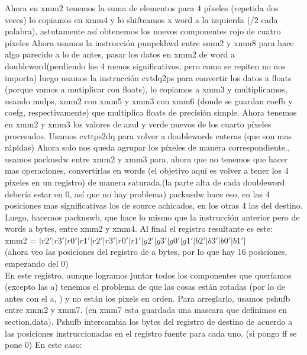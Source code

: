 \documentclass[a4paper]{article}
\begin{document}
   Ahora en xmm2 tenemos la suma de elementos para 4 píxeles (repetida dos veces) lo copiamos en xmm4 y lo shifteamos x word a la izquierda (/2 cada palabra), astutamente así obtenemos los nuevos componentes rojo de cuatro píxeles\hfill \break
   Ahora usamos la instrucción punpckhwd entre smm2 y xmm8 para hace algo parecido a lo de antes,  pasar los datos en xmm2 de word a doubleword(perdiendo los 4 menos significativos, pero como se repiten no nos importa) luego usamos la instrucción cvtdq2ps para convertir los datos a floats (porque vamos a mutiplicar con floats), lo copiamos a xmm3 y multiplicamos, usando mulps, xmm2 con xmm5 y xmm3 con xmm6 (donde se guardan coefb y coefg, respectivamente) que multiplica floats de precisión simple. Ahora tenemos en xmm2 y xmm3 los valores de azul y verde nuevos de los cuarto píxeles procesados. Usamos cvttps2dq para volver a doublewords enteras (que son mas rápidas)\hfill \break
   Ahora solo nos queda agrupar los píxeles de  manera correspondiente., usamos packusdw entre xmm2 y xmm3 para, ahora que no tenemos que hacer mas operaciones, convertirlas en words (el objetivo aquí es volver a tener los 4 píxeles en un registro) de manera saturada.(la parte alta de cada doubleword debería estar en 0, así que no hay problema) packusdw hace eso, en las 4 posiciones mas significativas los de source achicados, en los otras 4  las del destino.\hfill \break
   \\
   Luego, hacemos packuswb, que hace lo mismo que la instrucción anterior pero de words a bytes, entre xmm2 y xmm4. Al final el registro resultante es este:
   \hfill \break \\
    xmm2 = $ | r2' | r3' | r0' | r1' | r2' | r3' | r0' | r1' | g2' | g3' | g0' | g1' | b2' | b3' | b0' | b1' | $ \hfill \break
    \\
    (ahora veo las posiciones del registro de a bytes, por lo que hay 16 posiciones, empezando del 0)
    \\
    \hfill \break
    En este registro, aunque logramos juntar todos los componentes que queríamos (excepto las a) tenemos el problema de que las cosas están rotadas (por lo de antes con el a, ) y no están los pixels en orden.
    \hfill \break
        Para arreglarlo, usamos pshufb entre xmm2 y xmm7. (en xmm7 esta guardada una mascara que definimos en section,data). Pshufb intercambia los bytes del registro de destino de acuerdo a las posiciones instruccionadas en el registro fuente para cada uno. (si pongo ff se pone 0)
        \hfill \break
        En este caso:
        \hfill \break
        
\end{document}
